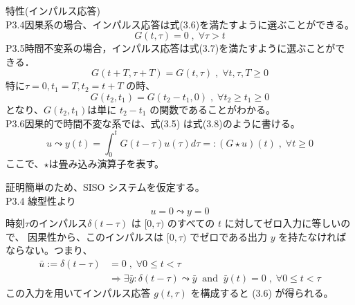 \documentclass{jsarticle}
\begin{document}
\newpage

特性(インパルス応答)\\
P3.4\;\;因果系の場合、インパルス応答は式(3.6)を満たすように選ぶことができる。
\begin{equation}
  G(t,\tau) = 0\;,\;\forall \tau>t \tag{3.6}
\end{equation}
P3.5\;\;時間不変系の場合，インパルス応答は式(3.7)を満たすように選ぶことができる．
\begin{equation}
  G(t+T,\tau+T) = G(t,\tau) \;,\;\forall t,\tau,T \geq 0 \tag{3.7}
\end{equation}
特に$\tau=0,t_1=T,t_2=t+T$ の時、
\begin{equation}
  G(t_2,t_1)=G(t_2-t_1,0)\;,\;\forall t_2\geq t_1\geq 0
\end{equation} 
となり、$G(t_2,t_1)$は単に $t_2-t_1$ の関数であることがわかる。\\
P3.6\;\;因果的で時間不変な系では、式(3.5) は式(3.8)のように書ける。
\begin{equation}
  u\leadsto y(t) = \int^t_0 G(t-\tau)u(\tau)d\tau =: (G\star u)(t)\;,\;\forall t\geq 0 \tag{3.8}
\end{equation}
ここで、$\star$は畳み込み演算子を表す。

証明\;\;簡単のため、SISO システムを仮定する。\\
P3.4\;\; 線型性より 
\begin{equation}
  u=0 \leadsto y=0
\end{equation}
時刻$\tau$のインパルス$\delta (t-\tau )$ は $[ 0 , \tau )$ のすべての $t$ に対してゼロ入力に等しいので、
因果性から、このインパルスは $[ 0 , \tau )$ でゼロである出力 $y$ を持たなければならない。つまり、
\begin{equation}
  \begin{aligned}
    \bar{u} := \delta (t-\tau) &= 0 \;,\;\forall 0\leq t <\tau\\
    &\Rightarrow \exists\bar{y}:\delta(t-\tau) \leadsto \bar{y} \;\;\text{and}\;\; \bar{y}(t) =0\;,\;\forall 0\leq t <\tau
  \end{aligned}
\end{equation}
この入力を用いてインパルス応答 $g ( t , \tau )$ を構成すると (3.6) が得られる。\\
\end{document}
